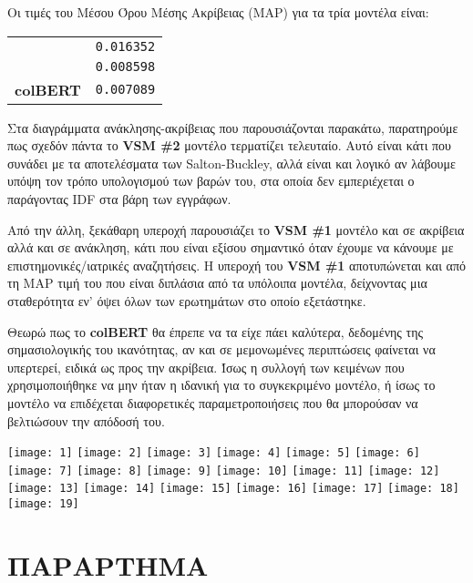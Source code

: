 ﻿\documentclass[12pt]{report}
\begin{document}
    Οι τιμές του Μέσου Όρου Μέσης Ακρίβειας (MAP) για τα τρία μοντέλα είναι:
    \begin{graycomment}
        \centering
        \begin{tabular}{ l l }
            \textbf{VSM #1}  & \texttt{0.016352} \\
            \textbf{VSM #2}  & \texttt{0.008598} \\
            \textbf{colBERT} & \texttt{0.007089}
        \end{tabular}
    \end{graycomment}

    Στα διαγράμματα ανάκλησης-ακρίβειας που παρουσιάζονται παρακάτω, παρατηρούμε πως σχεδόν πάντα το \textbf{VSM \#2} μοντέλο τερματίζει τελευταίο.
    Αυτό είναι κάτι που συνάδει με τα αποτελέσματα των Salton-Buckley, αλλά είναι και λογικό αν λάβουμε υπόψη τον τρόπο υπολογισμού των βαρών του, στα οποία δεν εμπεριέχεται ο παράγοντας IDF στα βάρη των εγγράφων.

    Από την άλλη, ξεκάθαρη υπεροχή παρουσιάζει το \textbf{VSM \#1} μοντέλο και σε ακρίβεια αλλά και σε ανάκληση, κάτι που είναι εξίσου σημαντικό όταν έχουμε να κάνουμε με επιστημονικές/ιατρικές αναζητήσεις.
    Η υπεροχή του \textbf{VSM \#1} αποτυπώνεται και από τη MAP τιμή του που είναι διπλάσια από τα υπόλοιπα μοντέλα, δείχνοντας μια σταθερότητα εν' όψει όλων των ερωτημάτων στο οποίο εξετάστηκε.

    Θεωρώ πως το \textbf{colBERT} θα έπρεπε να τα είχε πάει καλύτερα, δεδομένης της σημασιολογικής του ικανότητας, αν και σε μεμονωμένες περιπτώσεις φαίνεται να υπερτερεί, ειδικά ως προς την ακρίβεια.
    Ίσως η συλλογή των κειμένων που χρησιμοποιήθηκε να μην ήταν η ιδανική για το συγκεκριμένο μοντέλο, ή ίσως το μοντέλο να επιδέχεται διαφορετικές παραμετροποιήσεις που θα μπορούσαν να βελτιώσουν την απόδοσή του.


    \begin{multicols}{2}
        \centering
        \noindent\texttt{[image: 1]}
        \texttt{[image: 2]}
        \texttt{[image: 3]}
        \texttt{[image: 4]}
        \texttt{[image: 5]}
        \texttt{[image: 6]}
        \texttt{[image: 7]}
        \texttt{[image: 8]}
        \texttt{[image: 9]}
        \texttt{[image: 10]}
        \texttt{[image: 11]}
        \texttt{[image: 12]}
        \texttt{[image: 13]}
        \texttt{[image: 14]}
        \texttt{[image: 15]}
        \texttt{[image: 16]}
        \texttt{[image: 17]}
        \texttt{[image: 18]}
        \texttt{[image: 19]}
    \end{multicols}


    \chapter{ΠΑΡΑΡΤΗΜΑ}
    
\end{document}
